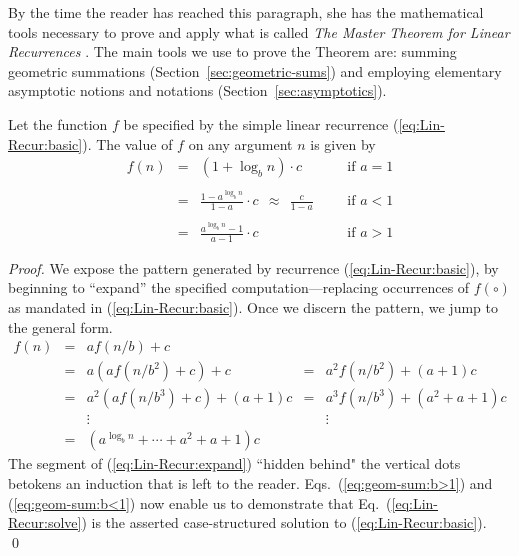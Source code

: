 \medskip

By the time the reader has reached this paragraph, she has the mathematical tools necessary to prove and apply what is called {\it The Master Theorem for Linear Recurrences} \cite{CLRS}.  The main tools we use to prove the Theorem are: summing geometric summations (Section~\ref{sec:geometric-sums}) and employing elementary asymptotic notions and notations (Section~\ref{sec:asymptotics}).

\begin{theorem}
\label{thm:master-thm-simple}
Let the function $f$ be specified by the simple linear recurrence (\ref{eq:Lin-Recur:basic}).  The value of $f$ on any argument $n$ is given by
\begin{equation}
\label{eq:Lin-Recur:solve}
\begin{array}{lcllll}
f(n) & = & (1 + \log_b n) \cdot c &  &  & \mbox{if } a=1 \\
      &    &                 &  &  & \\
      & = &
  {\displaystyle
  \frac{1-a^{\log_b n}}{1-a} \cdot c \ \ \approx \ \ \frac{c}{1-a}
  }
                               &  &  & \mbox{if } a<1 \\
    &   &                   &  &  & \\
    & = &
  {\displaystyle
\frac{a^{\log_b n} -1}{a-1} \cdot c
  }
                             &  &  & \mbox{if } a>1
\end{array}
\end{equation}
\end{theorem}

\begin{proof}
We expose the pattern generated by recurrence (\ref{eq:Lin-Recur:basic}), by beginning to ``expand'' the specified computation---replacing occurrences of $f(\circ)$ as mandated in
(\ref{eq:Lin-Recur:basic}).  Once we discern the pattern, we jump to the general form.
\begin{equation}
\label{eq:Lin-Recur:expand}
\begin{array}{lcccc}
f(n) & = & a f(n/b) + c & & \\
     & = & a \left( a f(n/b^2) + c \right) + c
             & = & a^2 f(n/b^2) + (a+1)c \\
     & = & a^2 \left( a f(n/b^3) + c \right) + (a+1)c
             & = & a^3 f(n/b^3) + (a^2+a+1)c \\
     &   & \vdots & & \vdots \\
     & = & 
{\displaystyle
\left(a^{\log_b n} + \cdots +a^2+a+1 \right) c
} & &
\end{array}
\end{equation}
The segment of (\ref{eq:Lin-Recur:expand}) ``hidden behind" the vertical dots betokens an induction that is left to the reader.  Eqs.~(\ref{eq:geom-sum:b>1}) and (\ref{eq:geom-sum:b<1}) now enable us to demonstrate that Eq.~(\ref{eq:Lin-Recur:solve}) is the asserted case-structured solution to (\ref{eq:Lin-Recur:basic}).  \qed
\end{proof}


